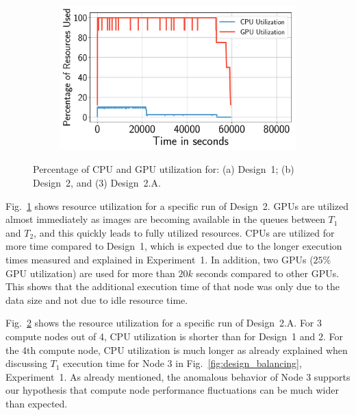 \begin{figure}[H]
\begin{subfigure}[b]{0.65\textwidth}
        \caption{}
        \label{fig:design2util}
    \end{subfigure}\\
    ~ 
    \begin{subfigure}[b]{0.65\textwidth}
        \includegraphics[width=\textwidth]{figures/designs/Design2AUtilization.pdf}
        \caption{}
        \label{fig:design2autil}
    \end{subfigure}
    \caption{Percentage of CPU and GPU utilization for: (a) Design~1; (b) Design~2, and (3) Design~2.A.}
    \label{fig:Utilization}
\end{figure}


Fig.~\ref{fig:design2util} shows resource utilization for a specific run of Design~2.
GPUs are utilized almost immediately as images are becoming available in the queues between $T_{1}$ and $T_{2}$, and this quickly leads to fully utilized resources.
CPUs are utilized for more time compared to Design~1, which is expected due to the longer execution times measured and explained in Experiment~1.
In addition, two GPUs ($25\%$ GPU utilization) are used for more than $20k$ seconds compared to other GPUs.
This shows that the additional execution time of that node was only due to the data size and not due to idle resource time.

Fig.~\ref{fig:design2autil} shows the resource utilization for a specific run of Design~2.A.
For 3 compute nodes out of 4, CPU utilization is shorter than for Design~1 and 2.
For the 4th compute node, CPU utilization is much longer as already explained when discussing $T_{1}$ execution time for Node 3 in Fig.~\ref{fig:design_balancing}, Experiment~1.
As already mentioned, the anomalous behavior of Node 3 supports our hypothesis that compute node performance fluctuations can be much wider than expected.

